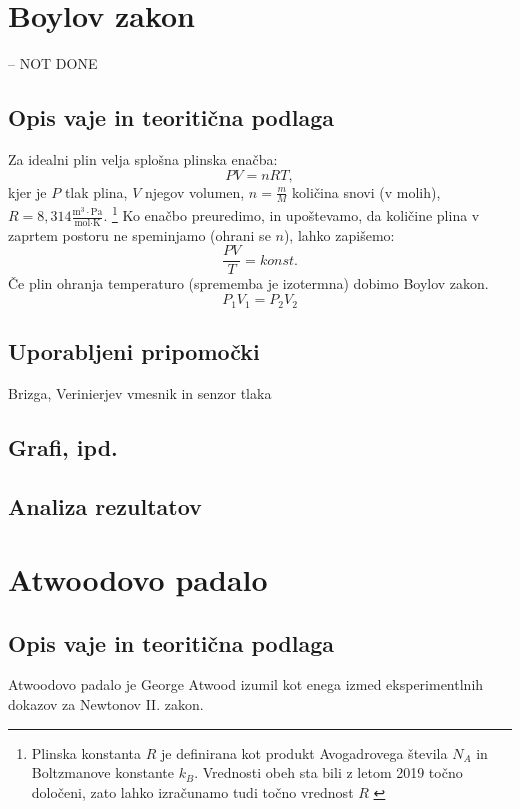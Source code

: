 \documentclass[12pt]{article}
\begin{document}
\newpage
\section{Boylov zakon} -- NOT DONE
	\subsection*{Opis vaje in teoritična podlaga}
	Za idealni plin velja splošna plinska enačba:
	\begin{equation}
		PV = nRT,
	\end{equation}
	kjer je $P$ tlak plina, $V$ njegov volumen, $n = \frac{m}{M}$ količina snovi (v molih),
	$R = 8,314 \frac{\text{m}^3 \cdot \text{Pa}}{\text{mol} \cdot \text{K}}$.
	\footnote{Plinska konstanta $R$ je definirana kot produkt Avogadrovega števila $N_A$ 
	in Boltzmanove konstante $k_B$. Vrednosti obeh sta bili z letom 2019 točno določeni, zato
	lahko izračunamo tudi točno vrednost $R$ \cite{redef}} Ko enačbo preuredimo, in upoštevamo, da količine
	plina v zaprtem postoru ne speminjamo (ohrani se $n$), lahko zapišemo:
	\begin{equation}
			\frac{PV}{T} = konst.
	\end{equation}
	Če plin ohranja temperaturo (sprememba je izotermna) dobimo Boylov zakon.
	\begin{equation}
		P_1 V_1 = P_2 V_2
		\label{boyle}
	\end{equation}

	\subsection*{Uporabljeni pripomočki}
	Brizga, Verinierjev vmesnik in senzor tlaka
	\subsection*{Grafi, ipd.}
	\subsection*{Analiza rezultatov}

\newpage
\section{Atwoodovo padalo}
	\subsection*{Opis vaje in teoritična podlaga}
	Atwoodovo padalo je George Atwood izumil kot enega izmed eksperimentlnih dokazov za
	Newtonov II. zakon. \newline
	
\end{document}
